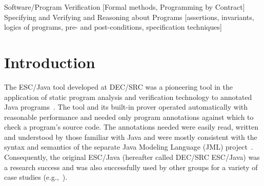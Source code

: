 \documentclass{sig-alternate}
\newif\ifpdf
\begin{document}
\newcommand{\myhref}[2]{\ifpdf\href{#1}{#2}\else\htmladdnormallinkfoot{#2}{#1}\fi}

\maketitle
\begin{abstract}
  The ESC/Java tool was a lauded advance in effective static checking
  of realistic Java programs, but has become out-of-date with respect
  to Java and the Java Modeling Language (JML).  The ESC/Java2
  project, whose progress is described in this paper, builds on the
  final release of ESC/Java from DEC/SRC in several ways.  It parses
  all of JML, thus can be used with the growing body of JML-annotated
  Java code; it has improved static checking capabilities, thus is
  becoming more complete and less unsound with each new release; and
  it has been designed, constructed, and documented in such a way as
  to improve the tool's availability to both users and researchers.
  It is intended that ESC/Java2 be used for further research in
  annotation and verification, for larger-scale case studies of
  annotation and verification, and for studies in programmer
  productivity that may result from integration with other tools that
  work with JML and Java.
\end{abstract}

                {Software/Program Verification}
                [Formal methods, Programming by Contract]
                {Specifying and Verifying and Reasoning about Programs}
                [assertions, invariants, logics of programs,
                pre- and post-conditions, specification techniques]




\section{Introduction}

The ESC/Java tool developed at DEC/SRC was a pioneering tool in the
application of static program analysis and verification technology to
annotated Java programs~\cite{Flanagan-etal02}.  The tool and its built-in
prover operated automatically with reasonable performance and needed
only program annotations against which to check a program's source
code.  The annotations needed were easily read, written and understood
by those familiar with Java and were mostly consistent with the syntax
and semantics of the separate Java Modeling Language (JML)
project~\cite{Leavens-etal00,jmlpapers}.  Consequently, the original
ESC/Java (hereafter called DEC/SRC ESC/Java) was a research success
and was also successfully used by other groups for a variety of case
studies (e.g.,~\cite{Hub03,HOP04}).
\end{document}
